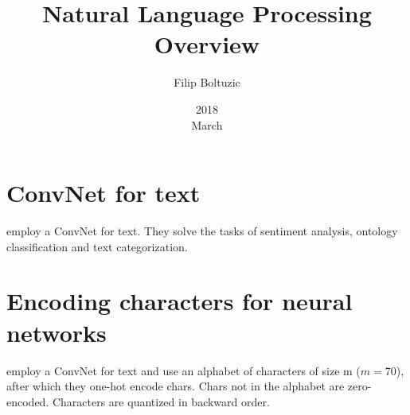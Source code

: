 \documentclass[a4paper,10pt]{article}
\title{Natural Language Processing Overview}
\author{Filip Boltuzic}
\date{2018 \\ March}
\begin{document}
\maketitle

\section{ConvNet for text}

\cite{Zhang2015} employ a ConvNet for text. They solve the tasks of
sentiment analysis, ontology classification and text
categorization. 

\section{Encoding characters for neural networks}

\cite{Zhang2015} employ a ConvNet for text and use an alphabet of 
characters of size m ($m=70$), after which they one-hot encode chars. 
Chars not in the alphabet are zero-encoded. Characters are quantized 
in backward order.



\end{document}
